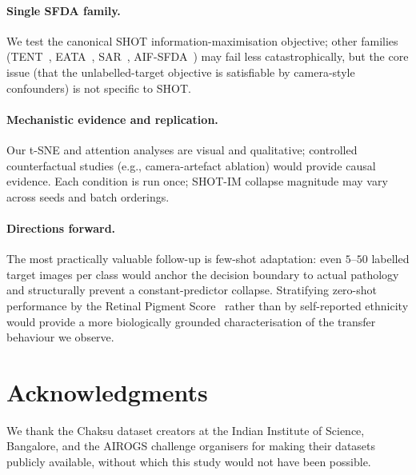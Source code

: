 \documentclass[11pt]{article}
\begin{document}
\paragraph{Single SFDA family.}
We test the canonical SHOT information-maximisation objective; other
families (TENT~\cite{wang2021tent}, EATA~\cite{niu2022eata},
SAR~\cite{niu2023sar}, AIF-SFDA~\cite{li2025aif}) may fail less
catastrophically, but the core issue (that the unlabelled-target
objective is satisfiable by camera-style confounders) is not specific
to SHOT.

\paragraph{Mechanistic evidence and replication.}
Our t-SNE and attention analyses are visual and qualitative; controlled
counterfactual studies (e.g., camera-artefact ablation) would provide
causal evidence. Each condition is run once; SHOT-IM collapse magnitude
may vary across seeds and batch orderings.

\paragraph{Directions forward.}
The most practically valuable follow-up is few-shot adaptation: even
$5$--$50$ labelled target images per class would anchor the decision
boundary to actual pathology and structurally prevent a constant-predictor
collapse. Stratifying zero-shot performance by the Retinal Pigment
Score~\cite{rajesh2025} rather than by self-reported ethnicity would
provide a more biologically grounded characterisation of the transfer
behaviour we observe.

\section*{Acknowledgments}

We thank the Chaksu dataset creators at the Indian Institute of Science, Bangalore, and the AIROGS challenge organisers for making their datasets publicly available, without which this study would not have been possible.
\end{document}
